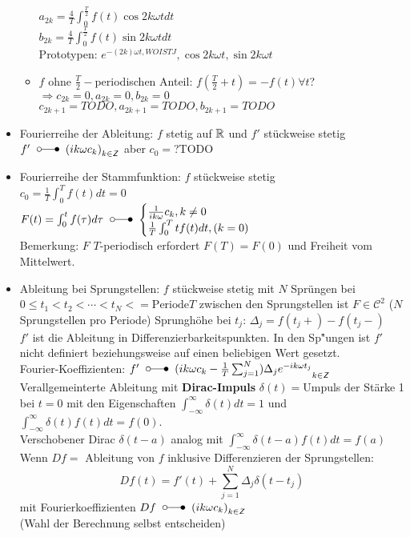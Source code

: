 \documentclass[nocolor,german]{latex4ei/latex4ei_sheet}
\DeclareMathOperator{\T}{\overset{\scriptscriptstyle\mathcal{}}{\ftsymbol}}						%
\begin{document}
\begin{itemize}
\begin{itemize}
					$a_{2k}=\frac{4}{T} \int_0^{\frac{T}{2}} f(t) \cos{2 k \omega t} d t$\\
					$b_{2k}=\frac{4}{T} \int_0^{\frac{T}{2}} f(t) \sin{2 k \omega t} dt $\\
					Prototypen: $e^{- (2k) \omega t, WO IST J},\cos{2 k \omega t},\sin{2 k \omega t}$
				\item $f$ ohne $\frac{T}{2}-$periodischen Anteil: $f(\frac{T}{2}+t)=-f(t) \forall t$?\\
					$\Rightarrow c_{2k}=0,a_{2k}=0,b_{2k}=0$\\
					$c_{2k+1}=TODO,a_{2k+1}=TODO,b_{2k+1}=TODO$
			\end{itemize}
		\item Fourierreihe der Ableitung: $f$ stetig auf $\operatorname{\mathbb R}$ und $f'$ st\"uckweise stetig\\
			$f'\T {(i k\omega c_k)}_{k\in\Z}$ aber $c_0=$?TODO
		\item Fourierreihe der Stammfunktion: $f$ st\"uckweise stetig\\
			$c_0=\frac{1}{T} \int_0^T f(t) d t=0$\\
			$F(t)=\int_0^t f(\tau) d \tau \T \begin{cases} \frac{1}{i k \omega} c_k , k \neq 0 \\ \frac{1}{T} \int_0^T t f(t) d t , (k=0)  \end{cases}$\\
				Bemerkung: $F$ $T$-periodisch erfordert $F(T)=F(0)$ und Freiheit vom Mittelwert.
		\item Ableitung bei Sprungstellen: $f$ st\"uckweise stetig mit $N$ Spr\"ungen bei $0 \le t_1 < t_2 < \cdots <t_N < =\mathrm{Periode}T$ zwischen den Sprungstellen ist $F\in \mathcal{C}^2$ ($N$ Sprungstellen pro Periode)
			Sprungh\"ohe bei $t_j$: $\Delta_j=f(t_{j}+)-f(t_{j}-)$\\
			$f'$ ist die Ableitung in Differenzierbarkeitspunkten. In den Sp\r"ungen ist $f'$ nicht definiert beziehungsweise auf einen beliebigen Wert gesetzt.\\
			Fourier-Koeffizienten: $f' \T {(i k \omega c_k - \frac{1}{T} \sum_{j=1}^N)\Delta_j e^{-ik\omega t_j}}_{k\in\Z}$\\
			Verallgemeinterte Ableitung mit \textbf{Dirac-Impuls} $\delta(t)=$Umpuls der St\"arke 1 bei $t=0$ mit den Eigenschaften $\int_{-\infty}^{\infty} \delta(t) d t=1$ und $\int_{-\infty}^{\infty}\delta(t) f(t) d t=f(0)$.\\
			Verschobener Dirac $\delta(t-a)$ analog mit $\int_{-\infty}^{\infty} \delta(t-a)f(t) d t=f(a)$\\
			Wenn $Df=$ Ableitung von $f$ inklusive Differenzieren der Sprungstellen:
			\[Df(t)=f'(t)+\sum_{j=1}^N \Delta_j \delta(t-t_j)\]
			mit Fourierkoeffizienten $Df \T {(i k \omega c_k)}_{k \in\Z}$\\
			(Wahl der Berechnung selbst entscheiden)
	\end{itemize}
\end{document}
